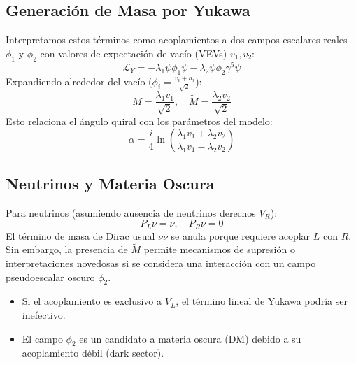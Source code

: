 \subsection{Generación de Masa por Yukawa}
Interpretamos estos términos como acoplamientos a dos campos escalares reales $\phi_1$ y $\phi_2$ con valores de expectación de vacío (VEVs) $v_1, v_2$:
\begin{equation}
    \mathcal{L}_Y = -\lambda_1 \overline{\psi} \phi_1 \psi - \lambda_2 \overline{\psi} \phi_2 \gamma^5 \psi
\end{equation}
Expandiendo alrededor del vacío ($\phi_i = \frac{v_i + h_i}{\sqrt{2}}$):
\begin{equation}
    M = \frac{\lambda_1 v_1}{\sqrt{2}}, \quad \tilde{M} = \frac{\lambda_2 v_2}{\sqrt{2}}
\end{equation}
Esto relaciona el ángulo quiral con los parámetros del modelo:
\begin{equation}
    \alpha = \frac{i}{4} \ln\left( \frac{\lambda_1 v_1 + \lambda_2 v_2}{\lambda_1 v_1 - \lambda_2 v_2} \right)
\end{equation}

\subsection{Neutrinos y Materia Oscura}
Para neutrinos (asumiendo ausencia de neutrinos derechos $V_R$):
\begin{equation}
    P_L \nu = \nu, \quad P_R \nu = 0
\end{equation}
El término de masa de Dirac usual $\overline{\nu}\nu$ se anula porque requiere acoplar $L$ con $R$. Sin embargo, la presencia de $\tilde{M}$ permite mecanismos de supresión o interpretaciones novedosas si se considera una interacción con un campo pseudoescalar oscuro $\phi_2$.
\begin{itemize}
    \item Si el acoplamiento es exclusivo a $V_L$, el término lineal de Yukawa podría ser inefectivo.
    \item El campo $\phi_2$ es un candidato a materia oscura (DM) debido a su acoplamiento débil (dark sector).
\end{itemize}